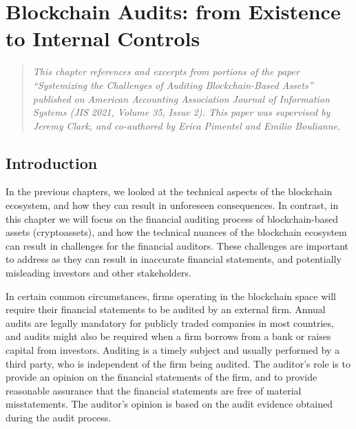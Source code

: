 \chapter{Blockchain Audits: from Existence to Internal Controls} \label{sec:auditing} 



\begin{quote}
	\textit{This chapter references and excerpts from portions of the paper ``Systemizing the Challenges of Auditing Blockchain-Based Assets''~\cite{pimentel2021systemizing} published on American Accounting Association Journal of Information Systems (JIS 2021, Volume 35, Issue 2). This paper was supervised by Jeremy Clark, and co-authored by Erica Pimentel and Emilio Boulianne.}
\end{quote}



\section{Introduction} \label{sec:auditing:intro}

In the previous chapters, we looked at the technical aspects of the blockchain ecosystem, and how they can result in unforeseen consequences. In contrast, in this chapter we will focus on the financial auditing process of blockchain-based assets (cryptoassets), and how the technical nuances of the blockchain ecosystem can result in challenges for the financial auditors. These challenges are important to address as they can result in inaccurate financial statements, and potentially misleading investors and other stakeholders.

In certain common circumstances, firms operating in the blockchain space will require their financial statements to be audited by an external firm. Annual audits are legally mandatory for publicly traded companies in most countries, and audits might also be required when a firm borrows from a bank or raises capital from investors. Auditing is a timely subject and usually performed by a third party, who is independent of the firm being audited. The auditor's role is to provide an opinion on the financial statements of the firm, and to provide reasonable assurance that the financial statements are free of material misstatements. The auditor's opinion is based on the audit evidence obtained during the audit process. 

